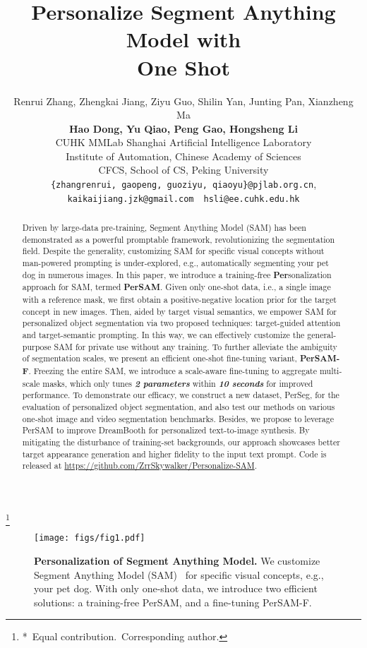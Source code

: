 \documentclass{article} \usepackage{iclr2024_conference,times}
\title{Personalize Segment Anything Model with\\One Shot}
\author{Renrui Zhang, Zhengkai Jiang, Ziyu Guo, Shilin Yan, Junting Pan, Xianzheng Ma\\\textbf{Hao Dong, Yu Qiao, Peng Gao, Hongsheng Li}\vspace{0.3cm}\\
  CUHK MMLab\quad 
  Shanghai Artificial Intelligence Laboratory\\
  Institute of Automation, Chinese Academy of Sciences\\
  CFCS, School of CS, Peking University\vspace{0.1cm}\\
\texttt{\{zhangrenrui, gaopeng, guoziyu, qiaoyu\}@pjlab.org.cn},\\
\texttt{kaikaijiang.jzk@gmail.com}\ \
\texttt{hsli@ee.cuhk.edu.hk}
}
\newcommand\blfootnote[1]{\begingroup
  \renewcommand\thefootnote{}\footnote{#1}\addtocounter{footnote}{-1}\endgroup
}
\begin{document}
\maketitle
\blfootnote{*\ Equal contribution.\quad \ Corresponding author.}

\begin{abstract}
Driven by large-data pre-training, Segment Anything Model (SAM) has been demonstrated as a powerful promptable framework, revolutionizing the segmentation field. 
    Despite the generality, customizing SAM for specific visual concepts without man-powered prompting is under-explored, e.g., automatically segmenting your pet dog in numerous images.
    In this paper, we introduce a training-free \textbf{Per}sonalization approach for SAM, termed \textbf{PerSAM}. 
    Given only one-shot data, i.e., a single image with a reference mask, we first obtain a positive-negative location prior for the target concept in new images. Then, aided by target visual semantics, we empower SAM for personalized object segmentation via two proposed techniques: target-guided attention and target-semantic prompting. In this way, we can effectively customize the general-purpose SAM for private use without any training. 
    To further alleviate the ambiguity of segmentation scales, we present an efficient one-shot fine-tuning variant, \textbf{PerSAM-F}. Freezing the entire SAM, we introduce a scale-aware fine-tuning to aggregate multi-scale masks, which only tunes \textit{\textbf{2 parameters}} within \textit{\textbf{10 seconds}} for improved performance. 
    To demonstrate our efficacy, we construct a new dataset, PerSeg, for the evaluation of personalized object segmentation, and also test our methods on various one-shot image and video segmentation benchmarks.
    Besides, we propose to leverage PerSAM to improve DreamBooth for personalized text-to-image synthesis. By mitigating the disturbance of training-set backgrounds, our approach showcases better target appearance generation and higher fidelity to the input text prompt. Code is released at \url{https://github.com/ZrrSkywalker/Personalize-SAM}.
\end{abstract}

\begin{figure*}[h]
  \centering
\texttt{[image: figs/fig1.pdf]}
   \caption{\textbf{Personalization of Segment Anything Model.} We customize Segment Anything Model (SAM)~\citep{kirillov2023segment} for specific visual concepts, e.g., your pet dog. With only one-shot data, we introduce two efficient solutions: a training-free PerSAM, and a fine-tuning PerSAM-F.}
    \label{fig1}
\end{figure*}
\end{document}
